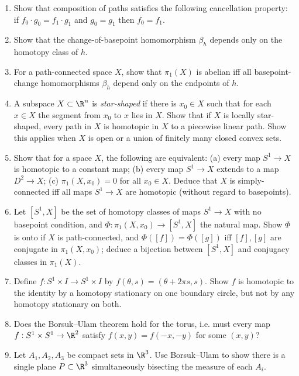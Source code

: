 \begin{enumerate}
\item Show that composition of paths satisfies the following cancellation property:
if $f_0\cdot g_0 = f_1\cdot g_1$ and $g_0=g_1$ then $f_0=f_1$.

\item Show that the change-of-basepoint homomorphism $\beta_h$ depends only on the
homotopy class of $h$.

\item For a path-connected space $X$, show that $\pi_1(X)$ is abelian iff all
basepoint-change homomorphisms $\beta_h$ depend only on the endpoints of $h$.

\item A subspace $X\subset\R^n$ is \textit{star-shaped} if there is $x_0\in X$ such that for
each $x\in X$ the segment from $x_0$ to $x$ lies in $X$. Show that if $X$ is locally
star-shaped, every path in $X$ is homotopic in $X$ to a piecewise linear path. Show
this applies when $X$ is open or a union of finitely many closed convex sets.

\item Show that for a space $X$, the following are equivalent: (a) every map
$S^1\to X$ is homotopic to a constant map; (b) every map $S^1\to X$ extends to a map
$D^2\to X$; (c) $\pi_1(X,x_0)=0$ for all $x_0\in X$. Deduce that $X$ is simply-connected
iff all maps $S^1\to X$ are homotopic (without regard to basepoints).

\item Let $[S^1,X]$ be the set of homotopy classes of maps $S^1\to X$ with no
basepoint condition, and $\Phi:\pi_1(X,x_0)\to[S^1,X]$ the natural map. Show $\Phi$ is
onto if $X$ is path-connected, and $\Phi([f])=\Phi([g])$ iff $[f],[g]$ are conjugate in
$\pi_1(X,x_0)$; deduce a bijection between $[S^1,X]$ and conjugacy classes in $\pi_1(X)$.

\item Define $f:S^1\times I\to S^1\times I$ by $f(\theta,s)=(\theta+2\pi s,s)$. Show $f$ is
homotopic to the identity by a homotopy stationary on one boundary circle, but not
by any homotopy stationary on both.

\item Does the Borsuk--Ulam theorem hold for the torus, i.e. must every map
$f:S^1\times S^1\to\R^2$ satisfy $f(x,y)=f(-x,-y)$ for some $(x,y)$?

\item Let $A_1,A_2,A_3$ be compact sets in $\R^3$. Use Borsuk--Ulam to show there is a
single plane $P\subset\R^3$ simultaneously bisecting the measure of each $A_i$.


\end{enumerate}
